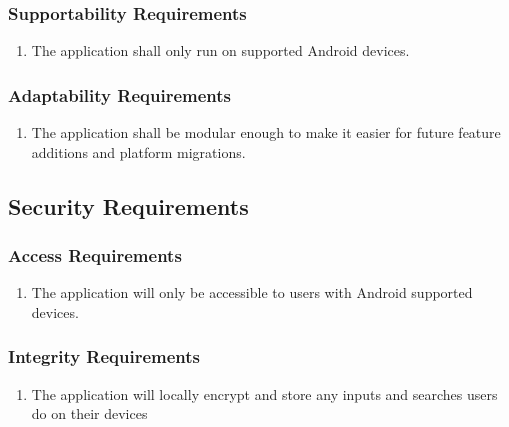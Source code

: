 \documentclass[titlepage]{article}
\newcounter{myCounter}
\begin{document}
\subsubsection{Supportability Requirements}
\label{ssub:supportability_requirements}
\begin{enumerate}[{MS}1. ]
    \setcounter{enumi}{\themyCounter}
	\item The application shall only run on supported Android devices.
    \setcounter{myCounter}{\theenumi}
\end{enumerate}

\subsubsection{Adaptability Requirements}
\label{ssub:adaptability_requirements}
\begin{enumerate}[{MS}1. ]
    \setcounter{enumi}{\themyCounter}
    \item The application shall be modular enough to make it easier for future feature additions and
    platform migrations.
    \setcounter{myCounter}{\theenumi}
\end{enumerate}


\subsection{Security Requirements}
\label{sub:security_requirements}
\setcounter{myCounter}{0}

\subsubsection{Access Requirements}
\label{ssub:access_requirements}
\begin{enumerate}[{SR}1. ]
    \setcounter{enumi}{\themyCounter}
	\item The application will only be accessible to users with Android supported devices.
    \setcounter{myCounter}{\theenumi}
\end{enumerate}

\subsubsection{Integrity Requirements}
\label{ssub:integrity_requirements}
\begin{enumerate}[{SR}1. ]
    \setcounter{enumi}{\themyCounter}
    \item The application will locally encrypt and store any inputs and searches users do on their
    devices
    \setcounter{myCounter}{\theenumi}
\end{enumerate}
\end{document}
